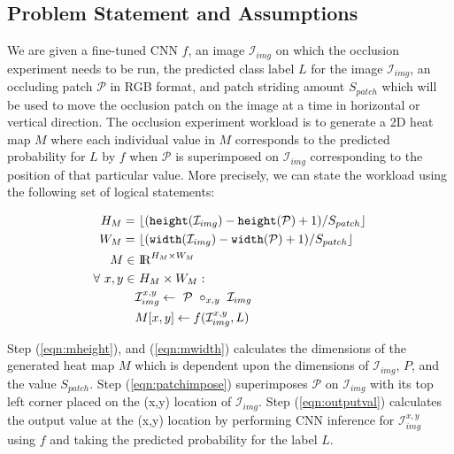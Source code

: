\subsection{Problem Statement and Assumptions}

We are given a fine-tuned CNN $f$, an image $\mathcal{I}_{img}$ on which the occlusion experiment needs to be run, the predicted class label $L$ for the image $\mathcal{I}_{img}$, an occluding patch $\mathcal{P}$ in RGB format, and patch striding amount $S_{patch}$ which will be used to move the occlusion patch on the image at a time in horizontal or vertical direction. The occlusion experiment workload is to generate a 2D heat map $M$ where each individual value in $M$ corresponds to the predicted probability for $L$ by $f$ when $\mathcal{P}$ is superimposed on $\mathcal{I}_{img}$ corresponding to the position of that particular value. More precisely, we can state the workload using the following set of logical statements:


\begin{align}
\label{eqn:mheight}
H_M =&~ \lfloor(\texttt{height}(\mathcal{I}_{img}) - \texttt{height}(\mathcal{P}) + 1)/S_{patch}\rfloor\\
\label{eqn:mwidth}
W_M =&~ \lfloor(\texttt{width}(\mathcal{I}_{img}) - \texttt{width}(\mathcal{P}) + 1)/S_{patch}\rfloor\\
M \in&~ \mathcal{\rm I\!R}^{H_M \times W_M}\\
\forall~ x,y \in&~ H_M \times W_M:\\
\label{eqn:patchimpose}
& \mathcal{I}_{img}^{x,y} \leftarrow ~\mathcal{P} ~\circ_{x,y} ~ \mathcal{I}_{img}\\
\label{eqn:outputval}
& M[x,y] \leftarrow f(\mathcal{I}_{img}^{x,y},L)
\end{align}

Step (\ref{eqn:mheight}), and (\ref{eqn:mwidth}) calculates the dimensions of the generated heat map $M$ which is dependent upon the dimensions of $\mathcal{I}_{img}$, $P$, and the value $S_{patch}$.
Step (\ref{eqn:patchimpose}) superimposes $\mathcal{P}$ on $\mathcal{I}_{img}$ with its top left corner placed on the (x,y) location of $\mathcal{I}_{img}$.
Step (\ref{eqn:outputval}) calculates the output value at the (x,y) location by performing CNN inference for $\mathcal{I}_{img}^{x,y}$ using $f$ and taking the predicted probability for the label $L$.

